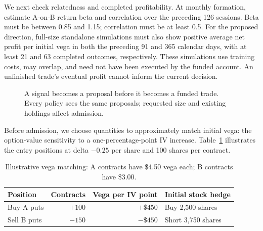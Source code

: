\documentclass[11pt,letterpaper]{article}
\newcommand{\money}[1]{\$#1}
\begin{document}
We next check relatedness and completed profitability. At monthly formation,
estimate A-on-B return beta and correlation over the preceding 126 sessions.
Beta must be between 0.85 and 1.15; correlation must be at least 0.5. For the
proposed direction, full-size standalone simulations must also show positive
average net profit per initial vega in both the preceding 91 and 365 calendar
days, with at least 21 and 63 completed outcomes, respectively. These
simulations use training costs, may overlap, and need not have been executed
by the funded account. An unfinished trade's eventual profit cannot inform
the current decision.

\begin{figure}[H]
\centering
{}
\caption{A signal becomes a proposal before it becomes a funded trade.
Every policy sees the same proposals; requested size and existing holdings
affect admission.}
\label{fig:workflow}
\end{figure}

Before admission, we choose quantities to approximately match initial vega: the
option-value sensitivity to a one-percentage-point IV increase.
Table~\ref{tab:trade} illustrates the entry positions at delta $-0.25$ per
share and 100 shares per contract.
\begin{table}[H]
\centering\small
\begin{tabular}{lrrl}
\toprule
Position & Contracts & Vega per IV point & Initial stock hedge\\
\midrule
Buy A puts & $+100$ & $+\money{450}$ & Buy 2,500 shares\\
Sell B puts & $-150$ & $-\money{450}$ & Short 3,750 shares\\
\bottomrule
\end{tabular}
\caption{Illustrative vega matching: A contracts have \money{4.50} vega each;
B contracts have \money{3.00}.}
\label{tab:trade}
\end{table}
\end{document}
